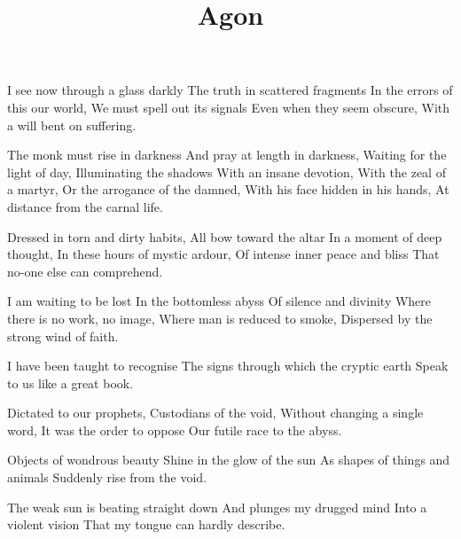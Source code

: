 \documentclass{article}
\title{Agon}
\newenvironment{stanza}{\begin{minipage}{10cm}\begin{internallinenumbers}\obeylines}{\end{internallinenumbers}\end{minipage}\vspace{\baselineskip}}
\begin{document}
\maketitle

\clearpage


\begin{stanza}
I see now through a glass darkly
The truth in scattered fragments
In the errors of this our world,
We must spell out its signals
Even when they seem obscure,
With a will bent on suffering.
\end{stanza}

\begin{stanza}
The monk must rise in darkness
And pray at length in darkness,
Waiting for the light of day,
Illuminating the shadows
With an insane devotion,
With the zeal of a martyr,
Or the arrogance of the damned,
With his face hidden in his hands,
At distance from the carnal life.
\end{stanza}

\begin{stanza}
Dressed in torn and dirty habits,
All bow toward the altar
In a moment of deep thought,
In these hours of mystic ardour,
Of intense inner peace and bliss
That no-one else can comprehend.
\end{stanza}

\begin{stanza}
I am waiting to be lost
In the bottomless abyss
Of silence and divinity
Where there is no work, no image,
Where man is reduced to smoke,
Dispersed by the strong wind of faith.
\end{stanza}

\begin{stanza}
I have been taught to recognise
The signs through which the cryptic earth
Speak to us like a great book.
\end{stanza}

\begin{stanza}
Dictated to our prophets,
Custodians of the void,
Without changing a single word,
It was the order to oppose
Our futile race to the abyss.
\end{stanza}

\begin{stanza}
Objects of wondrous beauty
Shine in the glow of the sun
As shapes of things and animals
Suddenly rise from the void.
\end{stanza}

\begin{stanza}
The weak sun is beating straight down
And plunges my drugged mind
Into a violent vision
That my tongue can hardly describe.
\end{stanza}
\end{document}
